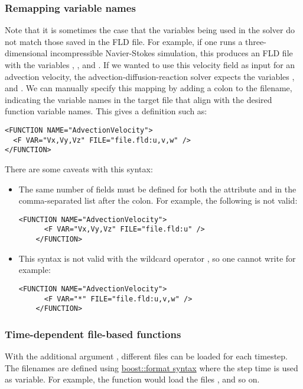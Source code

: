 \subsubsection{Remapping variable names}

Note that it is sometimes the case that the variables being used in the solver
do not match those saved in the FLD file. For example, if one runs a
three-dimensional incompressible Navier-Stokes simulation, this produces an FLD
file with the variables , ,  and . If we
wanted to use this velocity field as input for an advection velocity, the
advection-diffusion-reaction solver expects the variables , 
and . We can manually specify this mapping by adding a colon to the
filename, indicating the variable names in the target file that align with the
desired function variable names. This gives a definition such as:

\begin{lstlisting}[style=XMLStyle]
<FUNCTION NAME="AdvectionVelocity">
  <F VAR="Vx,Vy,Vz" FILE="file.fld:u,v,w" />
</FUNCTION>
\end{lstlisting}

There are some caveats with this syntax:

\begin{itemize}
  \item The same number of fields must be defined for both the 
  attribute and in the comma-separated list after the colon. For example, the
  following is not valid:
  \begin{lstlisting}[style=XMLStyle,gobble=4]
    <FUNCTION NAME="AdvectionVelocity">
      <F VAR="Vx,Vy,Vz" FILE="file.fld:u" />
    </FUNCTION>\end{lstlisting}
  \item This syntax is not valid with the wildcard operator \inltt{*}, so one
  cannot write for example:
  \begin{lstlisting}[style=XMLStyle,gobble=4]
    <FUNCTION NAME="AdvectionVelocity">
      <F VAR="*" FILE="file.fld:u,v,w" />
    </FUNCTION>
  \end{lstlisting}
\end{itemize}

\subsubsection{Time-dependent file-based functions}

With the additional argument , different files can be
loaded for each timestep. The filenames are defined using
\href{http://www.boost.org/doc/libs/1_56_0/libs/format/doc/format.html#syntax}{boost::format
  syntax} where the step time is used as variable. For example, the function
 would load the files ,
 and so on.

